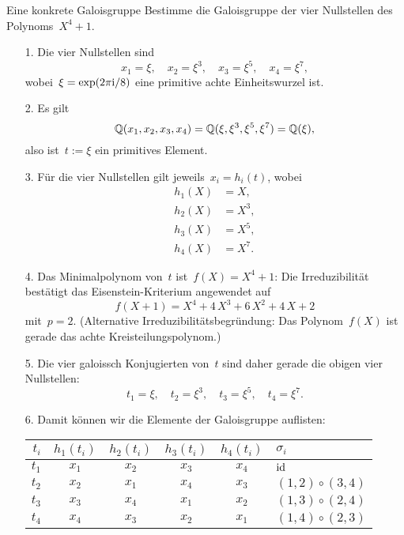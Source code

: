\documentclass{algblatt}
\begin{document}
\begin{aufgabe}{Eine konkrete Galoisgruppe}
Bestimme die Galoisgruppe der vier Nullstellen des Polynoms~$X^4 + 1$.

\begin{loesung}
\begin{enumerate}
\item[1.] Die vier Nullstellen sind
\[ x_1 = \xi,\quad
  x_2 = \xi^3,\quad
  x_3 = \xi^5,\quad
  x_4 = \xi^7, \]
wobei~$\xi = \exp(2\pi\mathrm{i}/8)$ eine primitive achte Einheitswurzel ist.

\item[2.] Es gilt
\[ \mathbb{Q}(x_1,x_2,x_3,x_4) = \mathbb{Q}(\xi,\xi^3,\xi^5,\xi^7) = \mathbb{Q}(\xi), \]
also ist~$t := \xi$ ein primitives Element.

\item[3.] Für die vier Nullstellen gilt jeweils~$x_i = h_i(t)$, wobei
\begin{align*}
  h_1(X) &= X, \\
  h_2(X) &= X^3, \\
  h_3(X) &= X^5, \\
  h_4(X) &= X^7.
\end{align*}

\item[4.] Das Minimalpolynom von~$t$ ist~$f(X) = X^4 + 1$: Die Irreduzibilität
bestätigt das Eisenstein-Kriterium angewendet auf
\[ f(X+1) = X^4 + 4 \,X^3 + 6\,X^2 + 4\,X + 2 \]
mit~$p = 2$. (Alternative Irreduzibilitätsbegründung: Das Polynom~$f(X)$ ist gerade
das achte Kreisteilungspolynom.)

\item[5.] Die vier galoissch Konjugierten von~$t$ sind daher gerade die obigen
vier Nullstellen:
\[ t_1 = \xi,\quad
  t_2 = \xi^3,\quad
  t_3 = \xi^5,\quad
  t_4 = \xi^7. \]

\item[6.] Damit können wir die Elemente der Galoisgruppe auflisten:
\begin{center}
  \begin{tabular}{@{}r|cccc|l@{}}
    $t_i$ & $h_1(t_i)$ & $h_2(t_i)$ & $h_3(t_i)$ & $h_4(t_i)$ & $\sigma_i$ \\\hline
    $t_1$ & $x_1$ & $x_2$ & $x_3$ & $x_4$ & $\mathrm{id}$ \\
    $t_2$ & $x_2$ & $x_1$ & $x_4$ & $x_3$ & $(1,2) \circ (3,4)$ \\
    $t_3$ & $x_3$ & $x_4$ & $x_1$ & $x_2$ & $(1,3) \circ (2,4)$ \\
    $t_4$ & $x_4$ & $x_3$ & $x_2$ & $x_1$ & $(1,4) \circ (2,3)$
  \end{tabular}
\end{center}
\end{enumerate}
\end{loesung}
\end{aufgabe}
\end{document}

